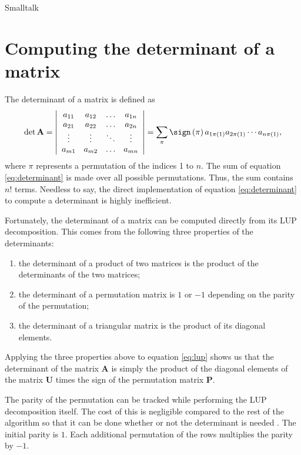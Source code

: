\begin{displaycode}{Smalltalk}
\section{Computing the determinant of a matrix}
\label{sec:determinant} The determinant of a matrix is defined as
\begin{equation}
\label{eq:determinant}
  \det\textbf{A}=\left|
  \begin{array}{cccc}a_{11}& a_{12}&\ldots& a_{1n}\\
  a_{21}& a_{22}&\ldots& a_{2n}\\
  \vdots&\vdots&\ddots&\vdots\\
  a_{m1}& a_{m2}&\ldots& a_{mn}\\ \end{array}
  \right|=\sum_{\pi}\sign\left({\pi}\right) a_{1\pi\left(1\right)}a_{2\pi\left(1\right)}
  \cdots a_{n\pi\left(1\right)},
\end{equation}
where $\pi$ represents a permutation of the indices 1 to $n$. The
sum of equation \ref{eq:determinant} is made over all possible
permutations. Thus, the sum contains $n!$ terms. Needless to say,
the direct implementation of equation \ref{eq:determinant} to
compute a determinant is highly inefficient.

Fortunately, the determinant of a matrix can be computed directly
from its LUP decomposition. This comes from the following three
properties of the determinants:
\begin{enumerate}
  \item the determinant of a product of two matrices is the product of the determinants of the two
  matrices;
  \item the determinant of a permutation matrix is $1$ or $-1$ depending on the parity of the
  permutation;
  \item the determinant of a triangular matrix is the product of its diagonal elements.
\end{enumerate}
Applying the three properties above to equation \ref{eq:lup} shows
us that the determinant of the matrix $\textbf{A}$ is simply the
product of the diagonal elements of the matrix $\textbf{U}$ times the
sign of the permutation matrix $\textbf{P}$.

The parity of the permutation can be tracked while performing the
LUP decomposition itself. The cost of this is negligible compared
to the rest of the algorithm so that it can be done whether or not
the determinant is needed . The initial parity is $1$. Each
additional permutation of the rows multiplies the parity by $-1$.


\end{displaycode}
